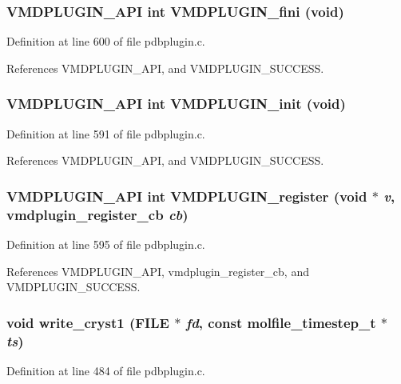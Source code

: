 \subsubsection{\setlength{\rightskip}{0pt plus 5cm}VMDPLUGIN\_\-API int VMDPLUGIN\_\-fini (void)}\label{pdbplugin_8c_a15}




Definition at line 600 of file pdbplugin.c.

References VMDPLUGIN\_\-API, and VMDPLUGIN\_\-SUCCESS.
\subsubsection{\setlength{\rightskip}{0pt plus 5cm}VMDPLUGIN\_\-API int VMDPLUGIN\_\-init (void)}\label{pdbplugin_8c_a13}




Definition at line 591 of file pdbplugin.c.

References VMDPLUGIN\_\-API, and VMDPLUGIN\_\-SUCCESS.
\subsubsection{\setlength{\rightskip}{0pt plus 5cm}VMDPLUGIN\_\-API int VMDPLUGIN\_\-register (void $\ast$ {\em v}, {\bf vmdplugin\_\-register\_\-cb} {\em cb})}\label{pdbplugin_8c_a14}




Definition at line 595 of file pdbplugin.c.

References VMDPLUGIN\_\-API, vmdplugin\_\-register\_\-cb, and VMDPLUGIN\_\-SUCCESS.
\subsubsection{\setlength{\rightskip}{0pt plus 5cm}void write\_\-cryst1 (FILE $\ast$ {\em fd}, const {\bf molfile\_\-timestep\_\-t} $\ast$ {\em ts})\hspace{0.3cm}{\tt  [static]}}\label{pdbplugin_8c_a9}




Definition at line 484 of file pdbplugin.c.

